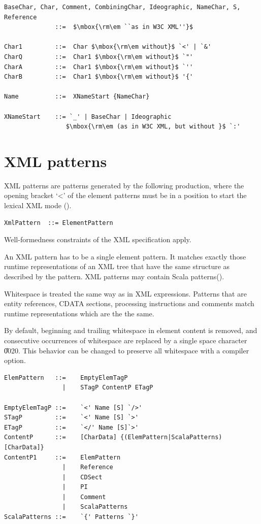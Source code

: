 \syntax\begin{lstlisting}
BaseChar, Char, Comment, CombiningChar, Ideographic, NameChar, S, Reference
              ::=  $\mbox{\rm\em ``as in W3C XML''}$

Char1         ::=  Char $\mbox{\rm\em without}$ `<' | `&'
CharQ         ::=  Char1 $\mbox{\rm\em without}$ `"'
CharA         ::=  Char1 $\mbox{\rm\em without}$ `''
CharB         ::=  Char1 $\mbox{\rm\em without}$ '{'

Name          ::=  XNameStart {NameChar}

XNameStart    ::= `_' | BaseChar | Ideographic 
                 $\mbox{\rm\em (as in W3C XML, but without }$ `:'

\end{lstlisting}
\section{XML patterns}\label{sec:xml-pats}
XML patterns are patterns generated by the following production, where
the opening bracket `<' of the element patterns must be in a position
to start the lexical XML mode ().

\syntax\begin{lstlisting}
XmlPattern  ::= ElementPattern 
\end{lstlisting}%
Well-formedness constraints of the XML specification apply.

An XML pattern has to be a single element pattern. It %
matches exactly those runtime
representations of an XML tree
that have the same structure as described by the pattern. %
XML patterns may contain Scala patterns().

Whitespace is treated the same way as in XML expressions. Patterns 
that are entity references, CDATA sections, processing 
instructions and comments match runtime representations which are the
the same.

By default, beginning and trailing whitespace in element content is removed, 
and consecutive occurrences of whitespace are replaced by a single space
character \U{0020}. This behavior can be changed to preserve all whitespace
with a compiler option.

\syntax\begin{lstlisting}
ElemPattern   ::=    EmptyElemTagP
                |    STagP ContentP ETagP                                    

EmptyElemTagP ::=    `<' Name [S] `/>'
STagP         ::=    `<' Name [S] `>'                          
ETagP         ::=    `</' Name [S]`>'                                        
ContentP      ::=    [CharData] {(ElemPattern|ScalaPatterns) [CharData]}
ContentP1     ::=    ElemPattern
                |    Reference
                |    CDSect
                |    PI
                |    Comment
                |    ScalaPatterns
ScalaPatterns ::=    `{' Patterns `}'
\end{lstlisting}


